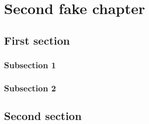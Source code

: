 
\chapter{Second fake chapter\label{chap:chap2_fake}}
\minitoc

\section{First section}

\subsection{Subsection 1}

\lipsum[1-10]

\subsection{Subsection 2}

\lipsum[1-10]

\section{Second section}

\lipsum[1-10]
